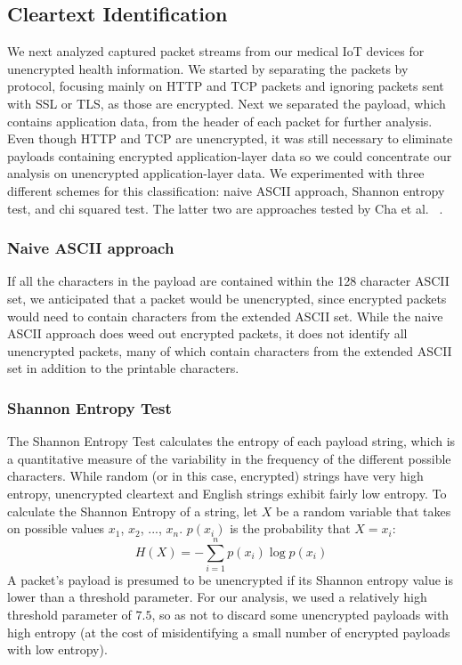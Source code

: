 \subsection{Cleartext Identification}

We next analyzed captured packet streams from our medical IoT devices for unencrypted health information. We started by separating the packets by protocol, focusing mainly on HTTP and TCP packets and ignoring packets sent with SSL or TLS, as those are encrypted. Next we separated the payload, which contains application data, from the header of each packet for further analysis. Even though HTTP and TCP are unencrypted, it was still necessary to eliminate payloads containing encrypted application-layer data so we could concentrate our analysis on unencrypted application-layer data. We experimented with three different schemes for this classification: naive ASCII approach, Shannon entropy test, and chi squared test. The latter two are approaches tested by Cha et al. ~\cite{chaMachineLearning}.

\subsubsection{Naive ASCII approach}
If all the characters in the payload are contained within the 128 character ASCII set, we anticipated that a packet would be unencrypted, since encrypted packets would need to contain characters from the extended ASCII set. While the naive ASCII approach does weed out encrypted packets, it does not identify all unencrypted packets, many of which contain characters from the extended ASCII set in addition to the printable characters. 

\subsubsection{Shannon Entropy Test}
The Shannon Entropy Test calculates the entropy of each payload string, which is a quantitative measure of the variability in the frequency of the different possible characters. While random (or in this case, encrypted) strings have very high entropy, unencrypted cleartext and English strings exhibit fairly low entropy. To calculate the Shannon Entropy of a string, let $X$ be a random variable that takes on possible values $x_1$, $x_2$, ..., $x_n$. $p(x_i)$ is the probability that $X = x_i$:
$$H(X) = - \sum_{i = 1}^{n} p(x_i) \log p(x_i)$$
A packet's payload is presumed to be unencrypted if its Shannon entropy value is lower than a threshold parameter. For our analysis, we used a relatively high threshold parameter of $7.5$, so as not to discard some unencrypted payloads with high entropy (at the cost of misidentifying a small number of encrypted payloads with low entropy).

